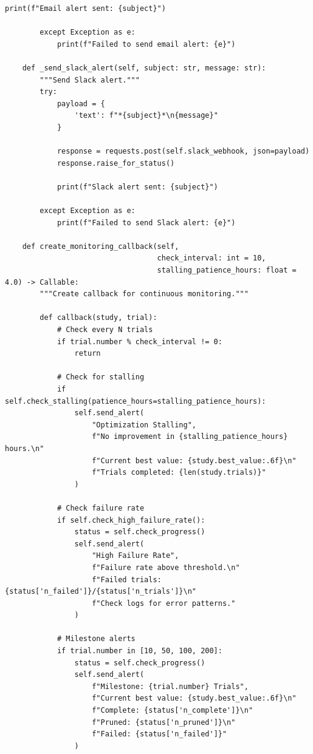 \begin{lstlisting}[style=python, caption=Monitoring and alerting for production HPO]
            print(f"Email alert sent: {subject}")

        except Exception as e:
            print(f"Failed to send email alert: {e}")

    def _send_slack_alert(self, subject: str, message: str):
        """Send Slack alert."""
        try:
            payload = {
                'text': f"*{subject}*\n{message}"
            }

            response = requests.post(self.slack_webhook, json=payload)
            response.raise_for_status()

            print(f"Slack alert sent: {subject}")

        except Exception as e:
            print(f"Failed to send Slack alert: {e}")

    def create_monitoring_callback(self,
                                   check_interval: int = 10,
                                   stalling_patience_hours: float = 4.0) -> Callable:
        """Create callback for continuous monitoring."""

        def callback(study, trial):
            # Check every N trials
            if trial.number % check_interval != 0:
                return

            # Check for stalling
            if self.check_stalling(patience_hours=stalling_patience_hours):
                self.send_alert(
                    "Optimization Stalling",
                    f"No improvement in {stalling_patience_hours} hours.\n"
                    f"Current best value: {study.best_value:.6f}\n"
                    f"Trials completed: {len(study.trials)}"
                )

            # Check failure rate
            if self.check_high_failure_rate():
                status = self.check_progress()
                self.send_alert(
                    "High Failure Rate",
                    f"Failure rate above threshold.\n"
                    f"Failed trials: {status['n_failed']}/{status['n_trials']}\n"
                    f"Check logs for error patterns."
                )

            # Milestone alerts
            if trial.number in [10, 50, 100, 200]:
                status = self.check_progress()
                self.send_alert(
                    f"Milestone: {trial.number} Trials",
                    f"Current best value: {study.best_value:.6f}\n"
                    f"Complete: {status['n_complete']}\n"
                    f"Pruned: {status['n_pruned']}\n"
                    f"Failed: {status['n_failed']}"
                )


\end{lstlisting}
